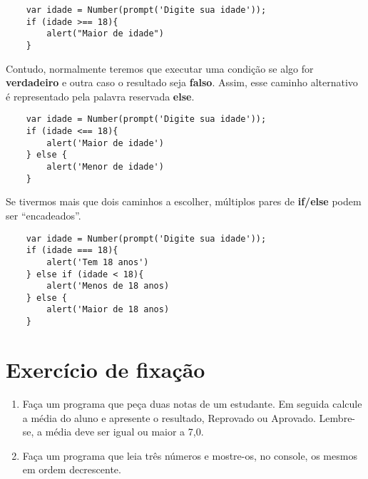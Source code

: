 \begin{lstlisting}
	var idade = Number(prompt('Digite sua idade'));
	if (idade >== 18){
		alert("Maior de idade")	
	}
\end{lstlisting}

Contudo, normalmente teremos que executar uma condição se algo for \textbf{verdadeiro} e outra caso o resultado seja \textbf{falso}. Assim, esse caminho alternativo é representado pela palavra reservada \textbf{else}. 

\begin{lstlisting}
	var idade = Number(prompt('Digite sua idade'));
	if (idade <== 18){
		alert('Maior de idade')	
	} else {
		alert('Menor de idade')	
	}
\end{lstlisting}

Se tivermos mais que dois caminhos a escolher, múltiplos pares de \textbf{if/else} podem ser ``encadeados''. 

\begin{lstlisting}
	var idade = Number(prompt('Digite sua idade'));
	if (idade === 18){
		alert('Tem 18 anos')	
	} else if (idade < 18){
		alert('Menos de 18 anos)	
	} else {
		alert('Maior de 18 anos)	
	}
\end{lstlisting}

\section{Exercício de fixação}

\begin{enumerate}
	\item Faça um programa que peça duas notas de um estudante. Em seguida calcule a média do aluno e apresente o resultado, Reprovado ou Aprovado. Lembre-se, a média deve ser igual ou maior a 7,0.
	\item Faça um programa que leia três números e mostre-os, no console, os mesmos em ordem decrescente. 
\end{enumerate}
